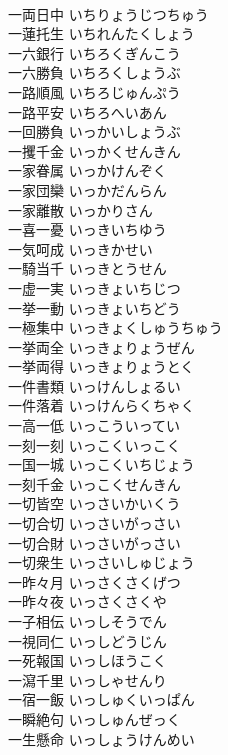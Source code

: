 \documentclass[8pt]{extreport}
\begin{document}
\begin{CJK}{UTF8}{min}
\\	一両日中	いちりょうじつちゅう	
\\	一蓮托生	いちれんたくしょう	
\\	一六銀行	いちろくぎんこう	
\\	一六勝負	いちろくしょうぶ	
\\	一路順風	いちろじゅんぷう	
\\	一路平安	いちろへいあん	
\\	一回勝負	いっかいしょうぶ	
\\	一攫千金	いっかくせんきん	
\\	一家眷属	いっかけんぞく	
\\	一家団欒	いっかだんらん	
\\	一家離散	いっかりさん	
\\	一喜一憂	いっきいちゆう	
\\	一気呵成	いっきかせい	
\\	一騎当千	いっきとうせん	
\\	一虚一実	いっきょいちじつ	
\\	一挙一動	いっきょいちどう	
\\	一極集中	いっきょくしゅうちゅう	
\\	一挙両全	いっきょりょうぜん	
\\	一挙両得	いっきょりょうとく	
\\	一件書類	いっけんしょるい	
\\	一件落着	いっけんらくちゃく	
\\	一高一低	いっこういってい	
\\	一刻一刻	いっこくいっこく	
\\	一国一城	いっこくいちじょう	
\\	一刻千金	いっこくせんきん	
\\	一切皆空	いっさいかいくう	
\\	一切合切	いっさいがっさい	
\\	一切合財	いっさいがっさい	
\\	一切衆生	いっさいしゅじょう	
\\	一昨々月	いっさくさくげつ	
\\	一昨々夜	いっさくさくや	
\\	一子相伝	いっしそうでん	
\\	一視同仁	いっしどうじん	
\\	一死報国	いっしほうこく	
\\	一瀉千里	いっしゃせんり	
\\	一宿一飯	いっしゅくいっぱん	
\\	一瞬絶句	いっしゅんぜっく	
\\	一生懸命	いっしょうけんめい	

\end{CJK}
\end{document}
